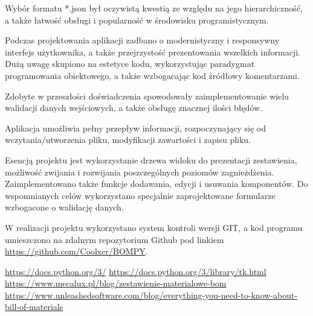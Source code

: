 \documentclass[12pt,twoside]{article}
\begin{document}
Wybór formatu *.json był oczywistą kwestią ze względu na jego hierarchiczność, a także łatwość obsługi i popularność w środowisku programistycznym.

Podczas projektowania aplikacji zadbano o modernistyczny i responsywny interfejs użytkownika, a także przejrzystość prezentowania wszelkich informacji. Dużą uwagę skupiono na estetyce kodu, wykorzystując paradygmat programowania obiektowego, a także wzbogacając kod źródłowy komentarzami.

Zdobyte w przeszłości doświadczenia spowodowały zaimplementowanie wielu walidacji danych wejściowych, a także obsługę znacznej ilości błędów.

Aplikacja umożliwia pełny przepływ informacji, rozpoczynający się od wczytania/utworzenia pliku, modyfikacji zawartości i zapisu pliku.

Esencją projektu jest wykorzystanie drzewa widoku do prezentacji zestawienia, możliwość zwijania i rozwijania poszczególnych poziomów zagnieżdżenia. Zaimplementowano także funkcje dodawania, edycji i usuwania komponentów. Do wspomnianych celów wykorzystano specjalnie zaprojektowane formularze wzbogacone o walidację danych.

W realizacji projektu wykorzystano system kontroli wersji GIT, a kod programu umieszczono na zdalnym repozytorium Github pod linkiem \url{https://github.com/Coolxer/BOMPY}.

\clearpage

\begin{thebibliography}{5}
 \url{https://docs.python.org/3/}
 \url{https://docs.python.org/3/library/tk.html}
 \url{https://www.mecalux.pl/blog/zestawienie-materialowe-bom}
 \url{https://www.unleashedsoftware.com/blog/everything-you-need-to-know-about-bill-of-materials}
\end{thebibliography}

\clearpage
\end{document}
